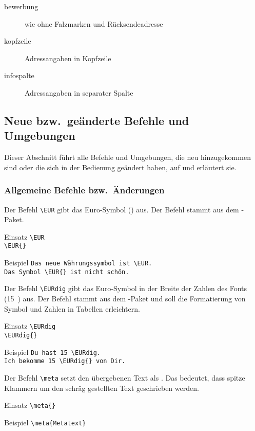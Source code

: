 \begin{description}
		\item [bewerbung] wie  ohne Falzmarken und Rücksendeadresse
		\item [kopfzeile] Adressangaben in Kopfzeile
		\item [infospalte] Adressangaben in separater Spalte
\end{description}

\subsection{Neue bzw.\ geänderte Befehle und Umgebungen}
\label{sec:New}

Dieser Abschnitt führt alle Befehle und Umgebungen, die neu hinzugekommen sind oder die sich in der Bedienung geändert haben, auf und erläutert sie.

\subsubsection{Allgemeine Befehle bzw.\ Änderungen}
\label{sec:New:Allgemein}

\DescribeMacro{\EUR}
Der Befehl \verb#\EUR# gibt das Euro-Symbol (\EUR) aus.
Der Befehl stammt aus dem -Paket.
\begin{einspiel}{Einsatz}
 \>\verb#\EUR#\\
 \>\verb#\EUR{}#
\end{einspiel}
\begin{einspiel}{Beispiel}
 \>\verb#Das neue Währungssymbol ist \EUR.#\\
 \>\verb#Das Symbol \EUR{} ist nicht schön.#
\end{einspiel}

\DescribeMacro{\EURdig}
Der Befehl \verb#\EURdig# gibt das Euro-Symbol in der Breite der Zahlen des
Fonts (15~\EURdig) aus.
Der Befehl stammt aus dem -Paket und
soll die Formatierung von Symbol und Zahlen in Tabellen erleichtern.
\begin{einspiel}{Einsatz}
 \>\verb#\EURdig#\\
 \>\verb#\EURdig{}#
\end{einspiel}
\begin{einspiel}{Beispiel}
 \>\verb#Du hast 15 \EURdig.#\\
 \>\verb#Ich bekomme 15 \EURdig{} von Dir.#
\end{einspiel}

\DescribeMacro{\meta}
Der Befehl \verb#\meta# setzt den übergebenen Text als .
Das
bedeutet, dass spitze Klammern um den schräg gestellten Text geschrieben werden.
\begin{einspiel}{Einsatz}
 \>\verb#\meta{#\verb#}#
\end{einspiel}
\begin{einspiel}{Beispiel}
 \>\verb#\meta{Metatext}#
\end{einspiel}

